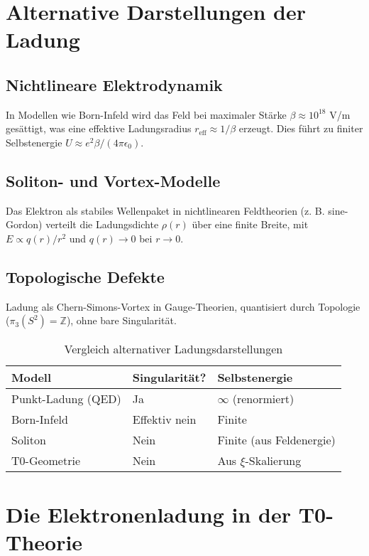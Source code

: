 \documentclass[12pt,a4paper]{article}
\begin{document}
	\section{Alternative Darstellungen der Ladung}
	\label{sec:alternativen}
	
	\subsection{Nichtlineare Elektrodynamik}
	In Modellen wie Born-Infeld wird das Feld bei maximaler Stärke $\beta \approx 10^{18}$ V/m gesättigt, was eine effektive Ladungsradius $r_{\text{eff}} \approx 1/\beta$ erzeugt. Dies führt zu finiter Selbstenergie $U \approx e^2 \beta / (4\pi \epsilon_0)$.
	
	\subsection{Soliton- und Vortex-Modelle}
	Das Elektron als stabiles Wellenpaket in nichtlinearen Feldtheorien (z. B. sine-Gordon) verteilt die Ladungsdichte $\rho(r)$ über eine finite Breite, mit $E \propto q(r)/r^2$ und $q(r) \to 0$ bei $r \to 0$.
	
	\subsection{Topologische Defekte}
	Ladung als Chern-Simons-Vortex in Gauge-Theorien, quantisiert durch Topologie ($\pi_3(S^2) = \mathbb{Z}$), ohne bare Singularität.
	
	\begin{table}[h]
		\centering
		\begin{tabular}{lll}
			\toprule
			\textbf{Modell} & \textbf{Singularität?} & \textbf{Selbstenergie} \\
			\midrule
			Punkt-Ladung (QED) & Ja & $\infty$ (renormiert) \\
			Born-Infeld & Effektiv nein & Finite \\
			Soliton & Nein & Finite (aus Feldenergie) \\
			T0-Geometrie & Nein & Aus $\xi$-Skalierung \\
			\bottomrule
		\end{tabular}
		\caption{Vergleich alternativer Ladungsdarstellungen}
		\label{tab:vergleich}
	\end{table}
	
	\section{Die Elektronenladung in der T0-Theorie}
	\label{sec:t0-ladung}
	
\end{document}

